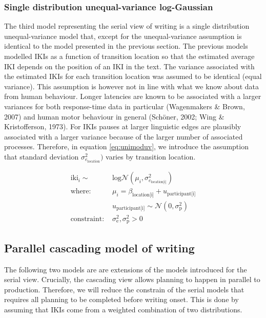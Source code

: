 \documentclass[
  man,floatsintext]{apa7}
\begin{document}
\hypertarget{single-distribution-unequal-variance-log-gaussian}{%
\subsubsection{Single distribution unequal-variance log-Gaussian}\label{single-distribution-unequal-variance-log-gaussian}}

The third model representing the serial view of writing is a single distribution unequal-variance model that, except for the unequal-variance assumption is identical to the model presented in the previous section. The previous models modelled IKIs as a function of transition location so that the estimated average IKI depends on the position of an IKI in the text. The variance associated with the estimated IKIs for each transition location was assumed to be identical (equal variance). This assumption is however not in line with what we know about data from human behaviour. Longer latencies are known to be associated with a larger variances for both response-time data in particular (Wagenmakers \& Brown, 2007) and human motor behaviour in general (Schöner, 2002; Wing \& Kristofferson, 1973). For IKIs pauses at larger linguistic edges are plausibly associated with a larger variance because of the larger number of associated processes. Therefore, in equation \ref{eq:unimoduv}, we introduce the assumption that standard deviation \(\sigma_{e_\text{location}}^2)\) varies by transition location.

\begin{equation}
\begin{aligned}
\label{eq:unimoduv}
\text{iki}_i \sim\text{ } & \text{log}\mathcal{N}(\mu_i, \sigma_{e_\text{location[i]}}^2) \\
\text{where: } & \mu_i = \beta_\text{location[i]} + u_\text{participant[i]}\\
 & u_\text{participant[i]} \sim \mathcal{N}(0, \sigma_\text{p}^2) \\
 \text{constraint: } & \sigma_\text{e}^2, \sigma_\text{p}^2>0
\end{aligned}
\end{equation}

\hypertarget{parallel-cascading-model-of-writing}{%
\subsection{Parallel cascading model of writing}\label{parallel-cascading-model-of-writing}}

The following two models are are extensions of the models introduced for the serial view. Crucially, the cascading view allows planning to happen in parallel to production. Therefore, we will reduce the constrain of the serial models that requires all planning to be completed before writing onset. This is done by assuming that IKIs come from a weighted combination of two distributions.
\end{document}
